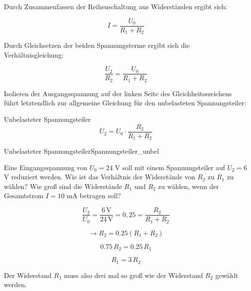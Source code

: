 \begin{frame}
{		Durch Zusammenfassen der Reihenschaltung aus Widerständen ergibt sich:

		\begin{equation*}
			I = \frac{U_0}{R_1+R_2}
		\end{equation*}

		Durch Gleichsetzen der beiden Spannungsterme ergibt sich die Verhältnisgleichung:



		\begin{equation*}
			\frac{U_2}{R_2} = \frac{U_0}{R_1+R_2}
		\end{equation*}

		Isolieren der Ausgangsspannung auf der linken Seite des Gleichheitsszeichens führt letztendlich
		zur allgemeine Gleichung für den unbelasteten Spannungsteiler:

		\begin{Merksatz}{Unbelasteter Spannungsteiler}
			\begin{equation}
				U_2 = U_0 \cdot \frac{R_2}{R_1+R_2}
			\end{equation}
		\end{Merksatz}


		\begin{bsp}{Unbelasteter Spannungsteiler}{Spannungsteiler_unbel}

			Eine Eingangsspannung von $U_0 = 24$ V soll mit einem Spannungsteiler auf $U_2 = 6$ V reduziert werden.
			Wie ist das Verhältnis der Widerstände von $R_2$ zu $R_1$ zu wählen?
			Wie groß sind die Widerstände $R_1$ und $R_2$ zu wählen, wenn der Gesamtstrom $I = 10$ mA betragen soll?

			\begin{equation*}
				\frac{U_2}{U_0} = \frac{6 \, \mathrm{V}}{24 \, \mathrm{V}} = 0,25 = \frac{R_2}{R_1+R_2}
			\end{equation*}

			\begin{equation*}
				\rightarrow R_2 = 0.25 (R_1+R_2)
			\end{equation*}

			\begin{equation*}
				0.75 \, R_2 = 0.25 \, R_1
			\end{equation*}

			\begin{equation*}
				R_1 = 3 \, R_2
			\end{equation*}


			Der Widerstand $R_1$ muss also drei mal so groß wie der Widerstand $R_2$ gewählt werden.\\




\end{bsp}}
\end{frame}
